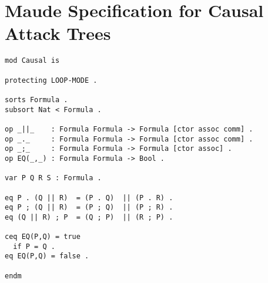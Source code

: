 \documentclass{llncs}
\begin{document}
\section{Maude Specification for Causal Attack Trees}
\label{sec:maude-spec-causal-attack-trees}
\begin{verbatim}
mod Causal is

protecting LOOP-MODE .

sorts Formula .
subsort Nat < Formula .

op _||_    : Formula Formula -> Formula [ctor assoc comm] .
op _._     : Formula Formula -> Formula [ctor assoc comm] .
op _;_     : Formula Formula -> Formula [ctor assoc] .
op EQ(_,_) : Formula Formula -> Bool .

var P Q R S : Formula .

eq P . (Q || R)  = (P . Q)  || (P . R) .
eq P ; (Q || R)  = (P ; Q)  || (P ; R) .
eq (Q || R) ; P  = (Q ; P)  || (R ; P) .

ceq EQ(P,Q) = true
  if P = Q .
eq EQ(P,Q) = false .

endm  
\end{verbatim}
\end{document}
